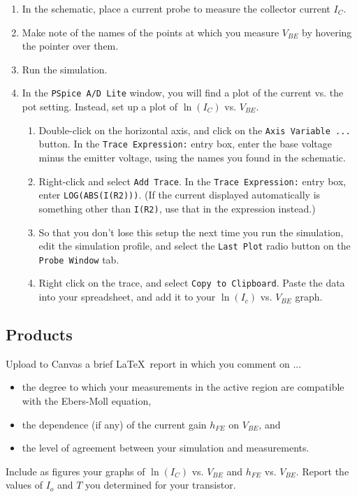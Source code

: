 \documentclass[11pt]{article}
\begin{document}
\begin{enumerate}
\item In the schematic, place a current probe to measure the collector
  current $I_C$.

\item Make note of the names of the points at which you measure
  $V_{BE}$ by hovering the pointer over them.

\item Run the simulation.

\item In the \texttt{PSpice A/D Lite} window, you will find a plot of
  the current vs. the pot setting. Instead, set up a plot of
  $\ln(I_C)$ vs. $V_{BE}$.
  \begin{enumerate}
  \item Double-click on the horizontal axis, and click on the
    \texttt{Axis Variable ...} button. In the \texttt{Trace
      Expression:} entry box, enter the base voltage minus the emitter
    voltage, using the names you found in the schematic.
  \item Right-click and select \texttt{Add Trace}. In the \texttt{Trace
      Expression:} entry box, enter \texttt{LOG(ABS(I(R2)))}. (If the
    current displayed automatically is something other than
    \texttt{I(R2)}, use that in the expression instead.)
  \item So that you don't lose this setup the next time you run the
    simulation, edit the simulation profile, and select the
    \texttt{Last Plot} radio button on the \texttt{Probe Window} tab.
  \item Right click on the trace, and select \texttt{Copy to
    Clipboard}. Paste the data into your spreadsheet, and add it to
    your $\ln(I_c)$ vs. $V_{BE}$ graph.
  \end{enumerate}
\end{enumerate}

\subsection*{Products}

Upload to Canvas a brief \LaTeX\ report in which you comment on ...
\begin{itemize}
  \item the degree to which your measurements in the active region are
    compatible with the Ebers-Moll equation,
  \item the dependence (if any) of the current gain $h_{FE}$ on
    $V_{BE}$, and
  \item the level of agreement between your simulation and
    measurements.
\end{itemize}
Include as figures your graphs of $\ln(I_C)$ vs. $V_{BE}$ and $h_{FE}$
vs. $V_{BE}$. Report the values of $I_o$ and $T$ you determined for
your transistor.
\end{document}
